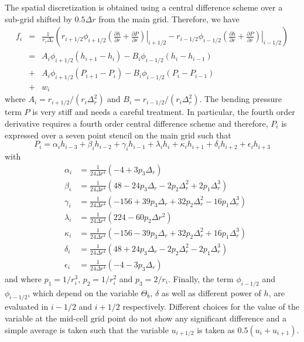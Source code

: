 The  spatial discretization  is  obtained using  a central  difference
scheme  over  a  sub-grid  shifted  by $0.5\Delta  r$  from  the  main
grid. Therefore, we have
\begin{eqnarray}
  f_i&=&\frac{1}{r_i \Delta_r}\left(r_{i+1/2}\phi_{i+1/2}\left.\left(\frac{\partial h}{\partial r}+\frac{\partial P}{\partial r}\right)\right|_{i+1/2}-r_{i-1/2}\phi_{i-1/2}\left.\left(\frac{\partial h}{\partial r}+\frac{\partial P}{\partial r}\right)\right|_{i-1/2}\right)\nonumber\\
     &=&A_i\phi_{i+1/2}\left(h_{i+1}-h_i\right)-B_i\phi_{i-1/2}\left(h_{i}-h_{i-1}\right)\nonumber\\
     &+&A_i\phi_{i+1/2}\left(P_{i+1}-P_i\right)-B_i\phi_{i-1/2}\left(P_{i}-P_{i-1}\right)\nonumber\\
     &+&w_i\label{C3-Num-3}
\end{eqnarray}
where                $A_i=r_{i+1/2}/(r_i\Delta_r^2)$               and
$B_i=r_{i-1/2}/(r_i\Delta_r^2)$.   The bending  pressure  term $P$  is
very stiff and  needs a careful treatment.  In  particular, the fourth
order derivative requires a fourth order central difference scheme and
therefore, $P_i$ is  expressed over a seven point stencil  on the main
grid such that
\begin{equation}
  P_{i}=   \alpha_{i}h_{i-3}  +   \beta_{i}h_{i-2}+\gamma_{i}  h_{i-1}
  +\lambda_{i}h_{i}+\kappa_{i}h_{i+1}+\delta_ih_{i+2}+\epsilon_ih_{i+3}
  \label{C3-Num-4}
\end{equation}
with
\begin{eqnarray}
  &\alpha_{i}&=\frac{1}{24\Delta r^{4}}\left(-4+3p_3\Delta_r \right)\nonumber \\
  &\beta_{i}&=\frac{1}{24\Delta r^{4}}\left(48-24p_3\Delta_r-2p_2\Delta_r^2+2p_1\Delta_r^3\right) \nonumber\\
  &\gamma_{i}&=\frac{1}{24\Delta r^{4}}\left(-156+39p_3\Delta_r+32p_2\Delta_r^2-16p_1\Delta_r^3\right)\nonumber\\
  &\lambda_{i}&=\frac{1}{24\Delta r^{4}}\left(224-60p_2\Delta r^{2}\right) \nonumber\\
  &\kappa_{i}&=\frac{1}{24\Delta r^{4}}\left( -156-39p_3\Delta_r+32p_2\Delta_r^2+16p_1\Delta_r^3\right)\nonumber\\
  &\delta_{i}&=\frac{1}{24\Delta r^{4}}\left( 48+24p_3\Delta_r-2p_2\Delta_r^2-2p_1\Delta_r^3\right) \nonumber\\
  &\epsilon_{i}&=\frac{1}{24\Delta r^{4}}\left(-4-3p_3\Delta_r \right)\nonumber
\end{eqnarray}
and where $p_1=1/r_i^3$, $p_2=1/r_i^2$ and $p_3 = 2/r_i$. Finally, the
term $\phi_{i-1/2}$  and $\phi_{i-1/2}$, which depend  on the variable
$\Theta_b$, $\delta$ as well as  different power of $h$, are evaluated
in $i-1/2$ and  $i+1/2$ respectively. Different choices  for the value
of the variable at the mid-cell grid point do not show any significant
difference  and a  simple  average  is taken  such  that the  variable
$u_{i+1/2}$ is taken as $0.5(u_i+u_{i+1})$.

